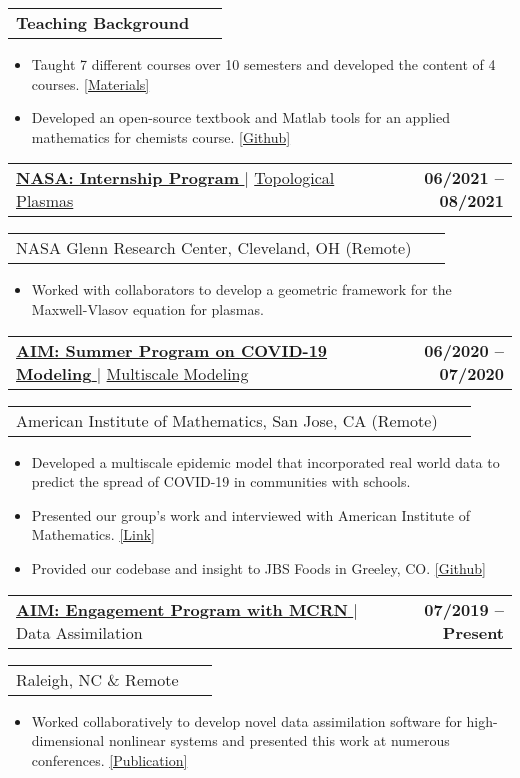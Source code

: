 \documentclass[letterpaper,11pt]{article}
\makeatletter
\newcommand{\accentcolor}[1]{\textcolor{accentcolor}{#1}}
\newcommand{\resumeItem}[1]{
  \item\small{
    {#1 \vspace{-2pt}}
  }
}
\newcommand{\resumeProjectHeading}[2]{
    \item
    \begin{tabular*}{1.001\textwidth}{l@{\extracolsep{\fill}}r}
      \small#1 & \textbf{\small #2}\\
    \end{tabular*}\vspace{-7pt}
}
\newcommand{\resumeItemListStart}{\begin{itemize}}
\newcommand{\resumeItemListEnd}{\end{itemize}\vspace{-5pt}}
\makeatother
\begin{document}
\resumeProjectHeading{\bf{Teaching Background}}{~}
\resumeItemListStart
            \resumeItem{\normalsize{Taught 7 different courses over 10 semesters and developed the content of 4 courses.} \href{https://www.colinroberts.net/teaching.html}{\accentcolor{[Materials]}}}
            \resumeItem{\normalsize{Developed an open-source textbook and Matlab tools for an applied mathematics for chemists course. \href{https://github.com/ColinPR/mathematics_for_physicists_and_chemists.git}{\accentcolor{[Github]}}}}
          \resumeItemListEnd
\vspace*{-10pt}
       \resumeProjectHeading
          {\href{https://intern.nasa.gov/}{\textbf{\large{NASA: Internship Program} \small{\raisebox{-0.1\height}\faExternalLink}}} $|$ \href{https://www.mathjobs.org/jobs/list/17245?rss}{\large{Topological Plasmas}}}{06/2021 -- 08/2021}
        \resumeProjectHeading{NASA Glenn Research Center, Cleveland, OH (Remote)}{~}
          \resumeItemListStart
            \resumeItem{\normalsize{Worked with collaborators to develop a geometric framework for the Maxwell-Vlasov equation for plasmas.}}
          \resumeItemListEnd
      \resumeProjectHeading{\href{https://aimath.org/workshops/upcoming/mcrn2020/}{\textbf{\large{AIM: Summer Program on COVID-19 Modeling} \small{\raisebox{-0.1\height}\faExternalLink}}} $|$ \href{https://mathcommunities.org/taking-aim-at-covid-19/}{\large{Multiscale Modeling}}}{06/2020 -- 07/2020}
        \resumeProjectHeading{American Institute of Mathematics, San Jose, CA (Remote)}{~}
          \resumeItemListStart
            \resumeItem{\normalsize{Developed a multiscale epidemic model that incorporated real world data to predict the spread of COVID-19 in communities with schools.}} 
			\resumeItem{\normalsize{Presented our group's work and interviewed with American Institute of Mathematics. \href{https://mathcommunities.org/taking-aim-at-covid-19/}{\accentcolor{[Link]}}}}
			\resumeItem{\normalsize{Provided our codebase and insight to JBS Foods in Greeley, CO.} \href{https://github.com/clairevalva/mcrn_multi_DA}{\accentcolor{[Github]}}}
          \resumeItemListEnd

          \resumeProjectHeading
          {\href{https://aimath.org/workshops/upcoming/mcrn2019/}{\textbf{\large{AIM: Engagement Program with MCRN}} \href{https://www.sciencedirect.com/science/article/abs/pii/S0898122121002121}{\raisebox{-0.1\height}\faExternalLink }} $|$ \large{Data Assimilation}}{07/2019 -- Present}
        \resumeProjectHeading{Raleigh, NC \& Remote}{~}
          \resumeItemListStart
            \resumeItem{\normalsize{Worked collaboratively to develop novel data assimilation software for high-dimensional nonlinear systems and presented this work at numerous conferences. \href{https://www.sciencedirect.com/science/article/abs/pii/S0898122121002121}{\accentcolor{[Publication]}}}}
          \resumeItemListEnd
\end{document}
